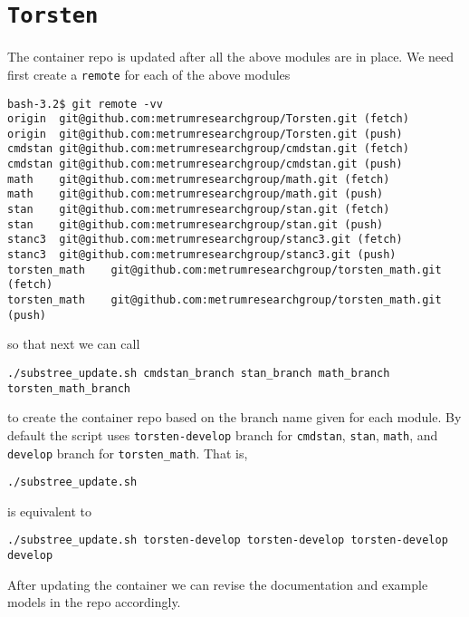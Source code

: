 \documentclass[12pt, reqno, oneside]{amsbook}
\numberwithin{equation}{chapter}
\numberwithin{figure}{chapter}
\numberwithin{table}{chapter}
\theoremstyle{remark}
\begin{document}
\section{\texttt{Torsten}}
\label{sec:org63cb8c1}
The container repo is updated after all the above modules are in
place. We need first create a \texttt{remote} for each of the above modules
\begin{verbatim}
bash-3.2$ git remote -vv
origin  git@github.com:metrumresearchgroup/Torsten.git (fetch)
origin  git@github.com:metrumresearchgroup/Torsten.git (push)
cmdstan git@github.com:metrumresearchgroup/cmdstan.git (fetch)
cmdstan git@github.com:metrumresearchgroup/cmdstan.git (push)
math    git@github.com:metrumresearchgroup/math.git (fetch)
math    git@github.com:metrumresearchgroup/math.git (push)
stan    git@github.com:metrumresearchgroup/stan.git (fetch)
stan    git@github.com:metrumresearchgroup/stan.git (push)
stanc3  git@github.com:metrumresearchgroup/stanc3.git (fetch)
stanc3  git@github.com:metrumresearchgroup/stanc3.git (push)
torsten_math    git@github.com:metrumresearchgroup/torsten_math.git (fetch)
torsten_math    git@github.com:metrumresearchgroup/torsten_math.git (push)
\end{verbatim}
so that next we can call
\begin{verbatim}
./substree_update.sh cmdstan_branch stan_branch math_branch torsten_math_branch
\end{verbatim}
to create the container repo based on the branch name given for each
module. By default the script uses \texttt{torsten-develop} branch for
\texttt{cmdstan}, \texttt{stan}, \texttt{math}, and \texttt{develop} branch for
\texttt{torsten\_math}. That is,
\begin{verbatim}
./substree_update.sh
\end{verbatim}
is equivalent to
\begin{verbatim}
./substree_update.sh torsten-develop torsten-develop torsten-develop develop
\end{verbatim}

After updating the container we can revise the documentation and
example models in the repo accordingly.
\end{document}
